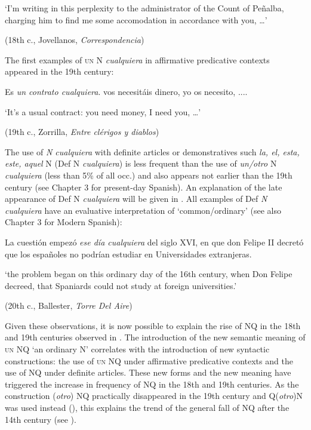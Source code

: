 \documentclass[output=paper]{langscibook}
\begin{document}
    ‘I’m writing in this perplexity to the administrator of the Count of Peñalba, charging him to find me some accomodation in accordance with you, …’

    (18th c., Jovellanos, \textit{Correspondencia})

The first examples of \textsc{un} N \textit{cualquiera} in affirmative predicative contexts appeared in the 19th century:

    Es \textit{un contrato cualquiera}. vos necesitáis dinero, yo os necesito, ....

    ‘It’s a usual contract: you need money, I need you, …’

    (19th c., Zorrilla, \textit{Entre clérigos y diablos})

The use of \textit{N cualquiera} with definite articles or demonstratives such \textit{la, el, esta, este, aquel} N (Def N \textit{cualquiera}) is less frequent than the use of \textit{un/otro} N \textit{cualquiera} (less than 5\% of all occ.) and also appears not earlier than the 19th century (see Chapter 3 for present-day Spanish). An explanation of the late appearance of Def N \textit{cualquiera} will be given in . All examples of Def \textit{N cualquiera} have an evaluative interpretation of ‘common/ordinary’ (see also Chapter 3 for Modern Spanish):

  La cuestión empezó \textit{ese día cualquiera} del siglo XVI, en que don Felipe II decretó que los españoles no podrían estudiar en Universidades extranjeras.

  ‘the problem began on this ordinary day of the 16th century, when Don Felipe decreed, that Spaniards could not study at foreign universities.’ 

  (20th c., Ballester, \textit{Torre Del Aire})

Given these observations, it is now possible to explain the rise of NQ in the 18th and 19th centuries observed in . The introduction of the new semantic meaning of \textsc{un} NQ ‘an ordinary N’ correlates with the introduction of new syntactic constructions: the use of \textsc{un} NQ under affirmative predicative contexts and the use of NQ under definite articles. These new forms and the new meaning have triggered the increase in frequency of NQ in the 18th and 19th centuries. As the construction (\textit{otro}) NQ practically disappeared in the 19th century and Q(\textit{otro})N was used instead (), this explains the trend of the general fall of NQ after the 14th century (see ).
\end{document}
